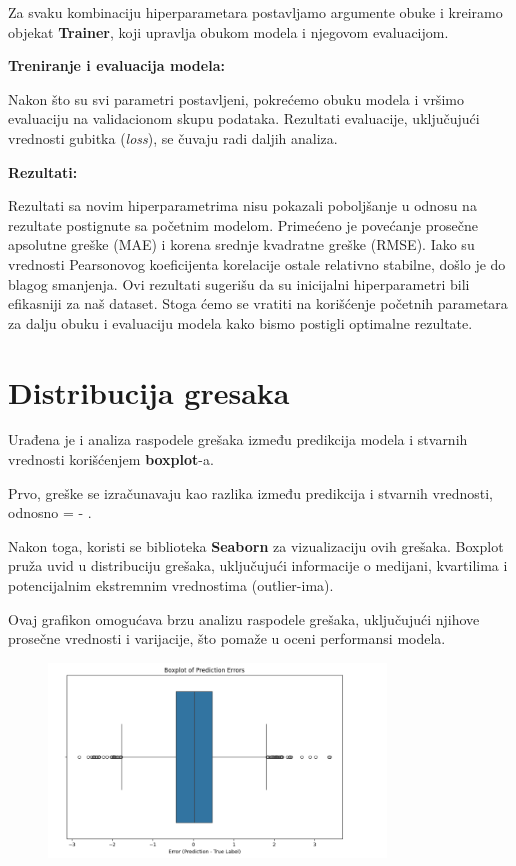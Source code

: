 \documentclass{article}
\begin{document}
Za svaku kombinaciju hiperparametara postavljamo argumente obuke i kreiramo objekat \textbf{Trainer}, koji upravlja obukom modela i njegovom evaluacijom.

\vspace{1em}
\textbf{Treniranje i evaluacija modela:}

Nakon što su svi parametri postavljeni, pokrećemo obuku modela i vršimo evaluaciju na validacionom skupu podataka. Rezultati evaluacije, uključujući vrednosti gubitka (\textit{loss}), se čuvaju radi daljih analiza.

\vspace{1em}
\textbf{Rezultati:}

Rezultati sa novim hiperparametrima nisu pokazali poboljšanje u odnosu na rezultate postignute sa početnim modelom. Primećeno je povećanje prosečne apsolutne greške (MAE) i korena srednje kvadratne greške (RMSE). Iako su vrednosti Pearsonovog koeficijenta korelacije ostale relativno stabilne, došlo je do blagog smanjenja. Ovi rezultati sugerišu da su inicijalni hiperparametri bili efikasniji za naš dataset. Stoga ćemo se vratiti na korišćenje početnih parametara za dalju obuku i evaluaciju modela kako bismo postigli optimalne rezultate.

\section{Distribucija gresaka}

Urađena je i analiza raspodele grešaka između predikcija modela i stvarnih vrednosti korišćenjem \textbf{boxplot}-a.

Prvo, greške se izračunavaju kao razlika između predikcija i stvarnih vrednosti, odnosno  =  - .

Nakon toga, koristi se biblioteka \textbf{Seaborn} za vizualizaciju ovih grešaka. Boxplot pruža uvid u distribuciju grešaka, uključujući informacije o medijani, kvartilima i potencijalnim ekstremnim vrednostima (outlier-ima).

Ovaj grafikon omogućava brzu analizu raspodele grešaka, uključujući njihove prosečne vrednosti i varijacije, što pomaže u oceni performansi modela.

\newpage
\begin{figure}[t]
    \centering 
    \includegraphics[width=0.8\textwidth]{ri4.png} 
\end{figure}
\end{document}
